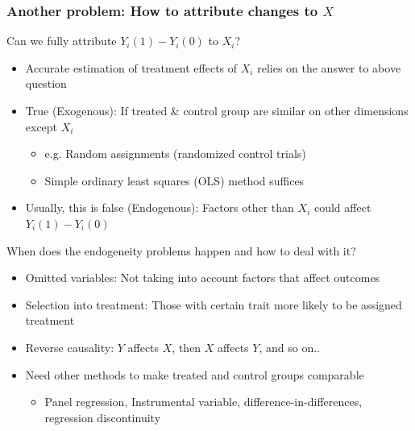 \documentclass[aspectratio=169]{beamer}
\begin{document}
\begin{frame}
\frametitle{Another problem: How to attribute changes to $X$} 
Can we fully attribute $Y_i(1)-Y_i(0)$ to $X_i$?
\begin{itemize}\setlength\itemsep{3pt}
\item Accurate estimation of treatment effects of $X_i$ relies on the answer to above question
\item True (Exogenous): If treated \& control group are similar on other dimensions except $X_i$
\begin{itemize}\setlength\itemsep{3pt}
\item e.g. Random assignments (randomized control trials)
\item Simple ordinary least squares (OLS) method suffices
\end{itemize}
\item Usually, this is false (Endogenous): Factors other than $X_i$ could affect $Y_i(1)-Y_i(0)$
\end{itemize}\medskip
When does the endogeneity problems happen and how to deal with it?
\begin{itemize}\setlength\itemsep{3pt}
\item Omitted variables: Not taking into account factors that affect outcomes
\item Selection into treatment: Those with certain trait more likely to be assigned treatment
\item Reverse causality: $Y$ affects $X$, then $X$ affects $Y$, and so on..
\item Need other methods to make treated and control groups comparable
\begin{itemize}\setlength\itemsep{3pt}
\item Panel regression, Instrumental variable, difference-in-differences, regression discontinuity
\end{itemize}
\end{itemize}
\end{frame}
\end{document}
